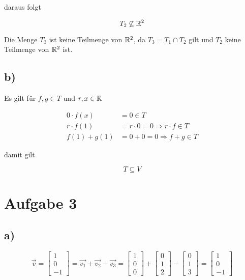 \documentclass[a4paper, 11pt]{article}
\begin{document}
daraus folgt

$$ T_2 \not\subseteq \mathbb{R}^2 $$

Die Menge \(T_3\) ist keine Teilmenge von \(\mathbb{R}^2\),
da \(T_3 = T_1 \cap T_2\) gilt und \(T_2\) keine Teilmenge von \(\mathbb{R}^2\) ist.

\subsection{b)}
\label{sec:org41719d4}
Es gilt für \(f, g \in T\) und \(r, x \in \mathbb{R}\)

\begin{align*}
    0 \cdot f(x) &= 0 \in T \\
    r \cdot f(1) &= r \cdot 0 = 0 \Rightarrow r \cdot f \in T \\
    f(1) + g(1) &= 0 + 0 = 0 \Rightarrow f + g \in T
\end{align*}

damit gilt

$$ T \subseteq V $$

\section{Aufgabe 3}
\label{sec:orgadeda94}
\subsection{a)}
\label{sec:orgfdad9e6}
$$ \overrightarrow{v} = \begin{bmatrix} 1 \\ 0 \\ -1\end{bmatrix} = \overrightarrow{v_1} + \overrightarrow{v_2} - \overrightarrow{v_3} =
\begin{bmatrix} 1 \\ 0 \\ 0\end{bmatrix} + \begin{bmatrix} 0 \\ 1 \\ 2\end{bmatrix} - \begin{bmatrix} 0 \\ 1 \\ 3\end{bmatrix} =  \begin{bmatrix} 1 \\ 0 \\ -1\end{bmatrix} $$
\end{document}
